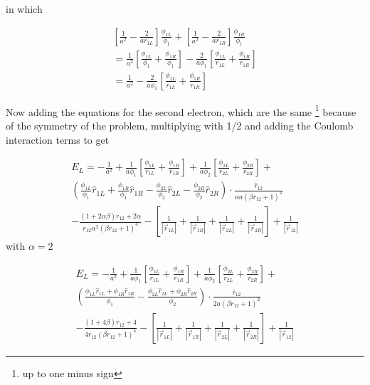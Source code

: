 \documentclass{article}
\begin{document}
in which 

\begin{multline}
   \left[\frac{1}{a^2}-\frac{2}{a{r}_{1L}} \right] \frac{\phi_{1L}}{\phi_1} + \left[\frac{1}{a^2} - \frac{2}{a{r}_{1R}} \right] \frac{\phi_{1R}}{\phi_1}   \\ = \frac{1}{a^2} \left[ \frac{\phi_{1L}}{\phi_1} + \frac{\phi_{1R}}{\phi_1} \right]-\frac{2}{a\phi_1}\left[ \frac{\phi_{1L}}{r_{1L}}+\frac{\phi_{1R}}{r_{1R}} \right] \\ = \frac{1}{a^2} -\frac{2}{a\phi_1}\left[ \frac{\phi_{1L}}{r_{1L}}+\frac{\phi_{1R}}{r_{1R}} \right]
\end{multline}

Now adding the equations for the second electron, which are the same \footnote{up to one minus sign} because of the symmetry of the problem, multiplying with 1/2 and adding the Coulomb interaction terms to get

\begin{multline}
 E_L = -\frac{1}{a^2} +\frac{1}{a\phi_1}\left[ \frac{\phi_{1L}}{r_{1L}}+\frac{\phi_{1R}}{r_{1R}} \right] + \frac{1}{a\phi_2} \left[ \frac{\phi_{2L}}{r_{2L}}+\frac{\phi_{2R}}{r_{2R}}\right]
 + \\ \left(  \frac{\phi_{1L}}{\phi_1}\hat{r}_{1L} +\frac{\phi_{1R}}{\phi_1}\hat{r}_{1R}   -   \frac{\phi_{2L}}{\phi_2}\hat{r}_{2L} -\frac{\phi_{2R}}{\phi_2}\hat{r}_{2R}     \right)  \cdot \frac{\hat{r}_{12}}{\alpha a(\beta r_{12}+1)^2} \\
  -   \frac{(1+2\alpha \beta) r_{12} + 2\alpha}{r_{12}\alpha^2(\beta r_{12}+1)^4} 
  - \left[ \frac{1}{|\vec{r}_{1L}|} +\frac{1}{|\vec{r}_{1R}|}+\frac{1}{|\vec{r}_{2L}|}+\frac{1}{|\vec{r}_{2R}|} \right] +\frac{1}{\left| \vec{r}_{12} \right|} 
\end{multline}
with $\alpha=2$


 \begin{multline}
 E_L = -\frac{1}{a^2} + \frac{1}{a\phi_1}\left[ \frac{\phi_{1L}}{r_{1L}}+\frac{\phi_{1R}}{r_{1R}} \right] + \frac{1}{a\phi_2} \left[ \frac{\phi_{2L}}{r_{2L}}+\frac{\phi_{2R}}{r_{2R}}\right]
 + \\ \left(  \frac{\phi_{1L}\hat{r}_{1L}+\phi_{1R}\hat{r}_{1R}}{\phi_1}   -    \frac{\phi_{2L}\hat{r}_{2L}+\phi_{2R}\hat{r}_{2R}}{\phi_2}     \right) \cdot \frac{\hat{r}_{12}}{2 a(\beta r_{12}+1)^2} \\
  -   \frac{(1+4 \beta) r_{12} + 4}{4r_{12}(\beta r_{12}+1)^4} 
  - \left[ \frac{1}{|\vec{r}_{1L}|} +\frac{1}{|\vec{r}_{1R}|}+\frac{1}{|\vec{r}_{2L}|}+\frac{1}{|\vec{r}_{2R}|} \right] +\frac{1}{\left| \vec{r}_{12} \right|} 
\end{multline}
\end{document}
